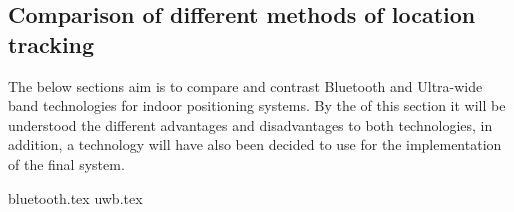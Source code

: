 \subsection{Comparison of different methods of location tracking}
The below sections aim is to compare and contrast Bluetooth and Ultra-wide band technologies for indoor positioning systems. By the of this section it will be understood the different advantages and disadvantages to both technologies, in addition, a technology will have also been decided to use for the implementation of the final system.

{bluetooth.tex}
{uwb.tex}
